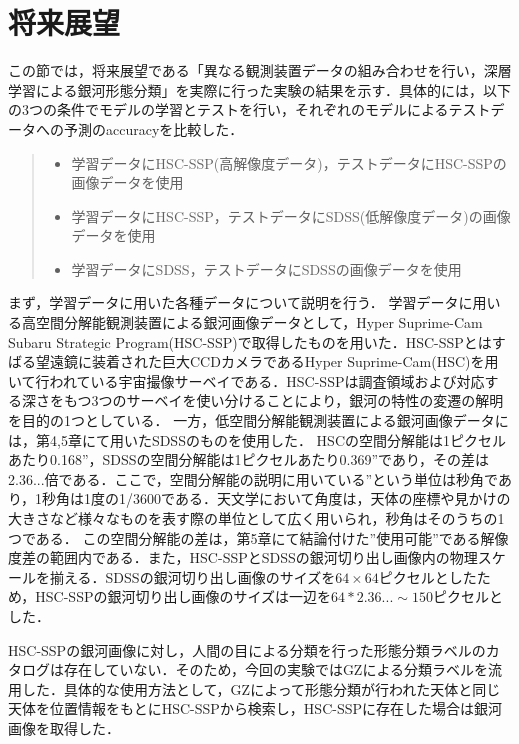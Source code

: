 \documentclass[a4j, 11pt]{jreport}
\begin{document}
\section{将来展望}
この節では，将来展望である「異なる観測装置データの組み合わせを行い，深層学習による銀河形態分類」を実際に行った実験の結果を示す．具体的には，以下の3つの条件でモデルの学習とテストを行い，それぞれのモデルによるテストデータへの予測のaccuracyを比較した．

\begin{quote}
 \begin{itemize}
  \item 学習データにHSC-SSP(高解像度データ)，テストデータにHSC-SSPの画像データを使用
  \item 学習データにHSC-SSP，テストデータにSDSS(低解像度データ)の画像データを使用
  \item 学習データにSDSS，テストデータにSDSSの画像データを使用
 \end{itemize}
\end{quote}

まず，学習データに用いた各種データについて説明を行う．
学習データに用いる高空間分解能観測装置による銀河画像データとして，Hyper Suprime-Cam Subaru Strategic Program(HSC-SSP)\cite{Tampo2020}で取得したものを用いた．HSC-SSPとはすばる望遠鏡に装着された巨大CCDカメラであるHyper Suprime-Cam(HSC)を用いて行われている宇宙撮像サーベイである．HSC-SSPは調査領域および対応する深さをもつ3つのサーベイを使い分けることにより，銀河の特性の変遷の解明を目的の1つとしている．
一方，低空間分解能観測装置による銀河画像データには，第4,5章にて用いたSDSSのものを使用した．
HSCの空間分解能は1ピクセルあたり0.168''，SDSSの空間分解能は1ピクセルあたり0.369''であり，その差は2.36...倍である．ここで，空間分解能の説明に用いている''という単位は秒角であり，1秒角は1度の1/3600である．天文学において角度は，天体の座標や見かけの大きさなど様々なものを表す際の単位として広く用いられ，秒角はそのうちの1つである．
この空間分解能の差は，第5章にて結論付けた''使用可能''である解像度差の範囲内である．また，HSC-SSPとSDSSの銀河切り出し画像内の物理スケールを揃える．SDSSの銀河切り出し画像のサイズを$64\times64$ピクセルとしたため，HSC-SSPの銀河切り出し画像のサイズは一辺を$64 * 2.36... \sim 150$ピクセルとした．

HSC-SSPの銀河画像に対し，人間の目による分類を行った形態分類ラベルのカタログは存在していない．そのため，今回の実験ではGZによる分類ラベルを流用した．具体的な使用方法として，GZによって形態分類が行われた天体と同じ天体を位置情報をもとにHSC-SSPから検索し，HSC-SSPに存在した場合は銀河画像を取得した．
\end{document}
